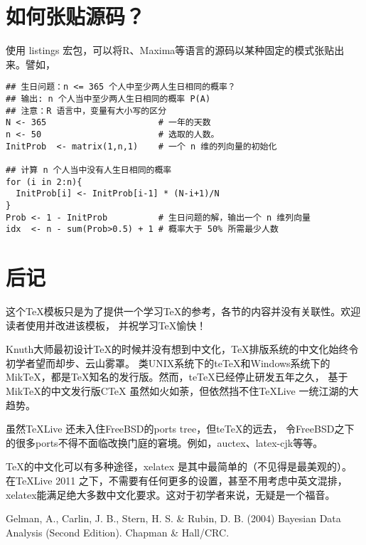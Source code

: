 \documentclass[12pt,a4paper]{article}
\begin{document}
\section{如何张贴源码？}
使用 listings 宏包，可以将R、Maxima等语言的源码以某种固定的模式张贴出来。譬如，

\begin{lstlisting}
## 生日问题：n <= 365 个人中至少两人生日相同的概率？
## 输出: n 个人当中至少两人生日相同的概率 P(A)
## 注意：R 语言中，变量有大小写的区分
N <- 365                      # 一年的天数
n <- 50                       # 选取的人数。
InitProb  <- matrix(1,n,1)    # 一个 n 维的列向量的初始化

## 计算 n 个人当中没有人生日相同的概率
for (i in 2:n){
  InitProb[i] <- InitProb[i-1] * (N-i+1)/N
}
Prob <- 1 - InitProb          # 生日问题的解，输出一个 n 维列向量
idx  <- n - sum(Prob>0.5) + 1 # 概率大于 50% 所需最少人数
\end{lstlisting}

\section{后记}
这个\TeX 模板只是为了提供一个学习\TeX 的参考，各节的内容并没有关联性。欢迎读者使用并改进该模板，
并祝学习\TeX 愉快！

Knuth大师最初设计\TeX 的时候并没有想到中文化，\TeX 排版系统的中文化始终令初学者望而却步、云山雾罩。
类UNIX系统下的teTeX和Windows系统下的MikTeX，都是\TeX 知名的发行版。然而，teTeX已经停止研发五年之久，
基于MikTeX的中文发行版CTeX 虽然如火如荼，但依然挡不住\TeX Live 一统江湖的大趋势。

虽然\TeX Live 还未入住FreeBSD的ports tree，但teTeX的远去，
令FreeBSD之下的很多ports不得不面临改换门庭的窘境。例如，auctex、latex-cjk等等。


\TeX 的中文化可以有多种途径，xelatex 是其中最简单的（不见得是最美观的）。
在\TeX Live 2011 之下，不需要有任何更多的设置，甚至不用考虑中英文混排，
xelatex能满足绝大多数中文化要求。这对于初学者来说，无疑是一个福音。


\begin{thebibliography}{}
 Gelman, A., Carlin, J. B., Stern, H. S. \& Rubin, D. B.
 (2004) Bayesian Data Analysis (Second Edition). \newblock Chapman \& Hall/CRC.
\end{thebibliography}
\clearpage
\end{document}
